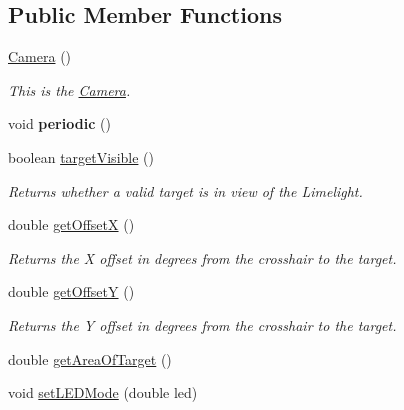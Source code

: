 \subsection*{Public Member Functions}
\begin{DoxyCompactItemize}
\item 
\mbox{\label{classfrc_1_1robot_1_1subsystems_1_1_camera_a43daae6cc7955d1d010e960d9cb8c07c}} 
\mbox{\hyperlink{classfrc_1_1robot_1_1subsystems_1_1_camera_a43daae6cc7955d1d010e960d9cb8c07c}{Camera}} ()
\begin{DoxyCompactList}\small\item\em This is the \mbox{\hyperlink{classfrc_1_1robot_1_1subsystems_1_1_camera}{Camera}}. \end{DoxyCompactList}\item 
\mbox{\label{classfrc_1_1robot_1_1subsystems_1_1_camera_a1d487538a84987b42881d036fad16106}} 
void {\bfseries periodic} ()
\item 
boolean \mbox{\hyperlink{classfrc_1_1robot_1_1subsystems_1_1_camera_ad8159ea1c074d6d13845abc44cd6eb02}{target\+Visible}} ()
\begin{DoxyCompactList}\small\item\em Returns whether a valid target is in view of the Limelight. \end{DoxyCompactList}\item 
double \mbox{\hyperlink{classfrc_1_1robot_1_1subsystems_1_1_camera_a09bb1ae0348f9a6bc018ce62169e188f}{get\+OffsetX}} ()
\begin{DoxyCompactList}\small\item\em Returns the X offset in degrees from the crosshair to the target. \end{DoxyCompactList}\item 
double \mbox{\hyperlink{classfrc_1_1robot_1_1subsystems_1_1_camera_a97f08ee461cdc433aae3a8d5a8b8388a}{get\+OffsetY}} ()
\begin{DoxyCompactList}\small\item\em Returns the Y offset in degrees from the crosshair to the target. \end{DoxyCompactList}\item 
double \mbox{\hyperlink{classfrc_1_1robot_1_1subsystems_1_1_camera_ab0d35016896e190da03a38c1d8bdaac8}{get\+Area\+Of\+Target}} ()
\item 
void \mbox{\hyperlink{classfrc_1_1robot_1_1subsystems_1_1_camera_a21264a7a789b2139797bf04bb7a15dbe}{set\+L\+E\+D\+Mode}} (double led)

\end{DoxyCompactItemize}
